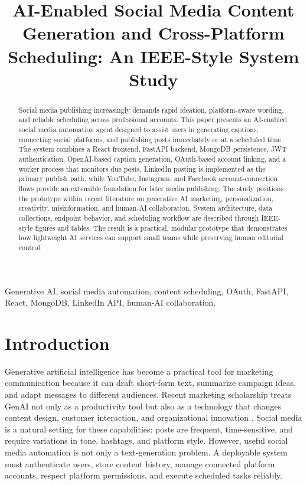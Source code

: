 \documentclass[conference]{IEEEtran}
\title{AI-Enabled Social Media Content Generation and Cross-Platform Scheduling: An IEEE-Style System Study}
\author{
\IEEEauthorblockN{Abhijeet Rai}
\IEEEauthorblockA{
Department of Computer Science and Engineering\\
AI Social Media Automation Agent Project\\
Email: abhijeet1104a@gmail.com
}
}
\begin{document}
\maketitle

\begin{abstract}
Social media publishing increasingly demands rapid ideation, platform-aware wording, and reliable scheduling across professional accounts. This paper presents an AI-enabled social media automation agent designed to assist users in generating captions, connecting social platforms, and publishing posts immediately or at a scheduled time. The system combines a React frontend, FastAPI backend, MongoDB persistence, JWT authentication, OpenAI-based caption generation, OAuth-based account linking, and a worker process that monitors due posts. LinkedIn posting is implemented as the primary publish path, while YouTube, Instagram, and Facebook account-connection flows provide an extensible foundation for later media publishing. The study positions the prototype within recent literature on generative AI marketing, personalization, creativity, misinformation, and human-AI collaboration. System architecture, data collections, endpoint behavior, and scheduling workflow are described through IEEE-style figures and tables. The result is a practical, modular prototype that demonstrates how lightweight AI services can support small teams while preserving human editorial control.
\end{abstract}

\begin{IEEEkeywords}
Generative AI, social media automation, content scheduling, OAuth, FastAPI, React, MongoDB, LinkedIn API, human-AI collaboration.
\end{IEEEkeywords}

\section{Introduction}
Generative artificial intelligence has become a practical tool for marketing communication because it can draft short-form text, summarize campaign ideas, and adapt messages to different audiences. Recent marketing scholarship treats GenAI not only as a productivity tool but also as a technology that changes content design, customer interaction, and organizational innovation \cite{grewal2025,cillo2025,dube2026}. Social media is a natural setting for these capabilities: posts are frequent, time-sensitive, and require variations in tone, hashtags, and platform style. However, useful social media automation is not only a text-generation problem. A deployable system must authenticate users, store content history, manage connected platform accounts, respect platform permissions, and execute scheduled tasks reliably.
\end{document}
